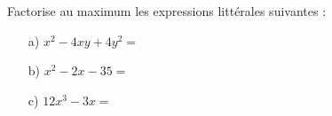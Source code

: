 \medskip
Factorise au maximum les expressions littérales suivantes :
\begin{enumerate}
\item[a)] $x^2-4 x y+4 y^2=$
\item[b)] $x^2-2 x-35=$
\item[c)] $12 x^3-3 x=$
\end{enumerate}